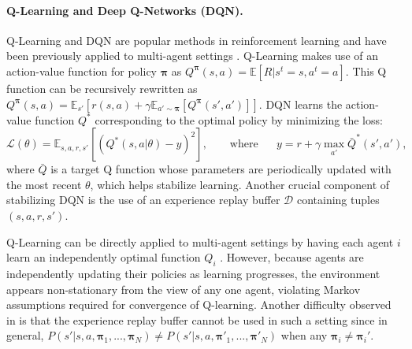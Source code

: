 \documentclass{article}
\newcommand{\pol}[0]{\pmb{\pi}}
\begin{document}
\paragraph{Q-Learning and Deep Q-Networks (DQN).}
Q-Learning and DQN \cite{mnih2015human} are popular methods in reinforcement learning and have been previously applied to multi-agent settings \cite{foerster16b,hyper_q}. Q-Learning makes use of an action-value function for policy $\pol$ as $Q^{\pol}(s, a) = \mathbb{E}[R | s^t = s, a^t = a]$.
This Q function can be recursively rewritten as $Q^{\pol}(s, a) = \mathbb{E}_{s'}[r(s,a) + \gamma \mathbb{E}_{a' \sim \pol}[Q^{\pol}(s', a')]]$. DQN learns the action-value function $Q^*$ corresponding to the optimal policy by minimizing the loss:
\begin{equation}
    \mathcal{L}(\theta) = \mathbb{E}_{s,a,r,s'}[(Q^*(s,a|\theta) - y)^2], \qquad
    \text{where~ } \quad y = r + \gamma \max_{a'} \bar{Q}^*(s', a'),
\end{equation}
where $\bar{Q}$ is a target Q function whose parameters are periodically updated with the most recent $\theta$, which helps stabilize learning. Another crucial component of stabilizing DQN is the use of an experience replay buffer $\mathcal{D}$ containing tuples $(s,a,r,s')$.

Q-Learning can be directly applied to multi-agent settings by having each agent $i$ learn an independently optimal function $Q_i$ \cite{tan93multi}. However, because agents are independently updating their policies as learning progresses, the environment appears non-stationary from the view of any one agent, violating Markov assumptions required for convergence of Q-learning. Another difficulty observed in \cite{foerster_nonstat} is that the experience replay buffer cannot be used in such a setting since in general, $P(s'|s,a,\pol_1,...,\pol_N) \neq P(s'|s,a,\pol'_1,...,\pol'_N)$ when any $\pol_i \neq \pol_i'$.
\end{document}
